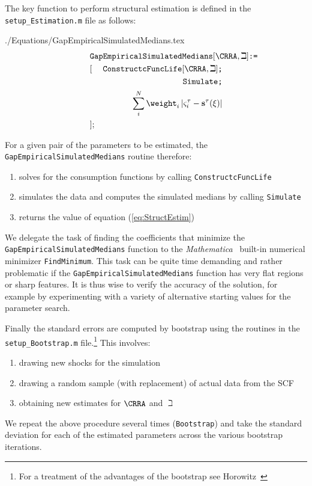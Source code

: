 \documentclass[titlepage]{\econtex}
\newcommand{\Mma}{\textit{Mathematica}}
\begin{document}
The key function to perform structural estimation is defined in the \texttt{setup\_Estimation.m} file as follows:
\begin{verbatimwrite}{./Equations/GapEmpiricalSimulatedMedians.tex}
\begin{eqnarray}
\lefteqn{    \texttt{GapEmpiricalSimulatedMedians$[\CRRA,\beth]$:=}} & &  \nonumber \\
&[&\texttt{ConstructcFuncLife$[\CRRA,\beth]$;}\nonumber\\
    &&\texttt{Simulate;}\nonumber\\
    &&\sum\limits_{i}^{N}\weight _{i}\left|\varsigma_{i}^{\tau }-\mathbf{s}^{\tau}(\xi )\right| \nonumber\\
    &];&\nonumber
\end{eqnarray}
\end{verbatimwrite}

For a given pair of the parameters to be estimated, the \texttt{GapEmpiricalSimulatedMedians} routine therefore:
\begin{enumerate}
    \item solves for the consumption functions by calling \texttt{ConstructcFuncLife}
    \item simulates the data and computes the simulated medians by calling \texttt{Simulate}
    \item returns the value of equation (\ref{eq:StructEstim})
\end{enumerate}

We delegate the task of finding the coefficients that minimize the
\texttt{GapEmpiricalSimulatedMedians} function to the \Mma~
built-in numerical minimizer \texttt{FindMinimum}.  This task can be
quite time demanding and rather problematic if the
\texttt{GapEmpiricalSimulatedMedians} function has very flat regions
or sharp features. It is thus wise to verify the accuracy of the
solution, for example by experimenting with a variety of alternative starting values for the
parameter search.

Finally the standard errors are computed by bootstrap using the
routines in the \texttt{setup\_Bootstrap.m} file.\footnote{For a
  treatment of the advantages of the bootstrap see
  Horowitz~\citeyearpar{horowitzBootstrap}} This involves:
\begin{enumerate}
    \item drawing new shocks for the simulation
    \item drawing a random sample (with replacement) of actual data from the SCF
    \item obtaining new estimates for $\CRRA$ and ${\beth}$
\end{enumerate}
We repeat the above procedure several times (\texttt{Bootstrap}) and take the standard deviation for each of the estimated parameters across the various bootstrap iterations.
\end{document}
